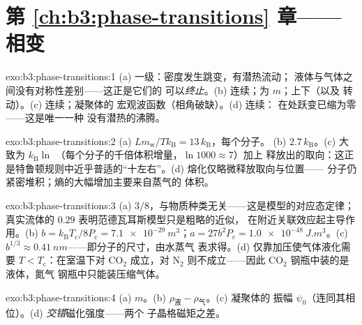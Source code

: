 \section*{第 \ref{ch:b3:phase-transitions} 章——相变}

\begin{solution}{exo:b3:phase-transitions:1}
(a) 一级：密度发生跳变，有潜热流动；
液体与气体之间没有对称性差别——这正是它们的
可以\emph{终止}。(b) 连续；为 $m$；上下（以及
转动）。(c) 连续；凝聚体的
宏观波函数（相角破缺）。(d) 连续：
在处跃变已缩为零——这是唯一一种
没有潜热的沸腾。
\end{solution}

\begin{solution}{exo:b3:phase-transitions:2}
(a) $Lm_{\text{w}}/Tk_{\text{B}} = 13\,k_{\text{B}}$，每个分子。
(b) $2.7\,k_{\text{B}}$。(c) 大致为 $k_{\text{B}}\ln$
（每个分子的千倍体积增量，$\ln1000 \approx 7$）加上
释放出的取向：这正是特鲁顿规则中近乎普适的“十左右”。(d)
熔化仅略微释放取向与位置——
分子仍紧密堆积；熵的大幅增加主要来自蒸气的
体积。
\end{solution}

\begin{solution}{exo:b3:phase-transitions:3}
(a) $3/8$，与物质种类无关——这是模型的对应态定律；
真实流体的 $0.29$ 表明范德瓦耳斯模型只是粗略的近似，
在附近关联效应起主导作用。(b) $b =
k_{\text{B}}T_{\text{c}}/8P_{\text{c}} = \qty{7.1e-29}{m^3}$；$a =
27b^2P_{\text{c}} = \qty{1.0e-48}{J.m^3}$。(c) $b^{1/3} \approx
\qty{0.41}{nm}$——即分子的尺寸，由水蒸气
表求得。(d) 仅靠加压使气体液化需要 $T <
T_{\text{c}}$：在室温下对 CO$_2$ 成立，对
N$_2$ 则不成立——因此 CO$_2$ 钢瓶中装的是液体，氮气
钢瓶中只能装压缩气体。
\end{solution}

\begin{solution}{exo:b3:phase-transitions:4}
(a) $m$。(b) $\rho_{\text{液}} - \rho_{\text{气}}$。(c) 凝聚体的
振幅 $\psi_0$（连同其相位）。(d)
\emph{交错}磁化强度——两个
子晶格磁矩之差。
\end{solution}


